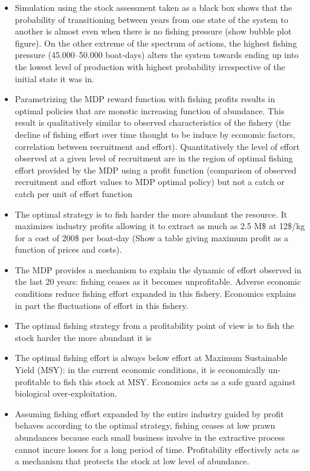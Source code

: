 \documentclass[11pt]{article}
\begin{document}
\begin{itemize}
\item Simulation using the stock assessment taken as a black box shows that the probability of transitioning between years from one state of the system to another is almost even when there is no fishing pressure (show bubble plot figure). On the other extreme of the spectrum of actions, the highest fishing pressure (45.000--50.000 boat-days) alters the system towards ending up into the lowest level of production with highest probability irrespective of the initial state it was in. 
\item Parametrizing the MDP reward function with fishing profits results in optimal policies that are monotic increasing function of abundance. This result is qualitatively similar to observed characteristics of the fishery (the decline of fishing effort over time thought to be induce by economic factors, correlation between recruitment and effort). Quantitatively the level of effort observed at a given level of recruitment are in the region of optimal fishing effort provided by the MDP using a profit function (comparison of observed recruitment and effort values to MDP optimal policy) but not a catch or catch per unit of effort function
\item The optimal strategy is to fish harder the more abundant the resource. It maximizes industry profits allowing it to extract as much as 2.5 M\$ at 12\$/kg for a cost of 200\$ per boat-day (Show a table giving maximum profit as a function of prices and costs). %
\item The MDP provides a mechanism to explain the dynamic of effort observed in the last 20 years: fishing ceases as it becomes unprofitable. Adverse economic conditions reduce fishing effort expanded in this fishery. Economics explains in part the fluctuations of effort in this fishery.
\item The optimal fishing strategy from a profitability point of view is to fish the stock harder the more abundant it is
\item The optimal fishing effort is always below effort at Maximum Sustainable Yield (MSY): in the current economic conditions, it is economically un-profitable to fish this stock at MSY. Economics acts as a safe guard against biological over-exploitation.
\item Assuming fishing effort expanded by the entire industry guided by profit behaves according to the optimal strategy,  fishing ceases at low prawn abundances because each small business involve in the extractive process cannot incure losses for a long period of time. Profitability effectively acts as a mechanism that protects the stock at low level of abundance. 
\end{itemize}
\end{document}
